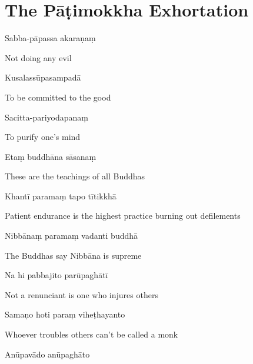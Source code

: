\section{The Pāṭimokkha Exhortation}

\begin{leader}
\end{leader}

Sabba-pāpassa akaraṇaṃ

\begin{cprenglish}
  Not doing any evil
\end{cprenglish}

Kusalassūpasampadā

\begin{cprenglish}
  To be committed to the good
\end{cprenglish}

Sacitta-pariyodapanaṃ

\begin{cprenglish}
  To purify one's mind
\end{cprenglish}

Etaṃ buddhāna sāsanaṃ

\begin{cprenglish}
  These are the teachings of all Buddhas
\end{cprenglish}

Khantī paramaṃ tapo tītikkhā

\begin{cprenglish}
  Patient endurance is the highest practice burning out defilements
\end{cprenglish}

Nibbānaṃ paramaṃ vadanti buddhā

\begin{cprenglish}
  The Buddhas say Nibbāna is supreme
\end{cprenglish}

Na hi pabbajito parūpaghātī

\begin{cprenglish}
  Not a renunciant is one who injures others
\end{cprenglish}

Samaṇo hoti paraṃ viheṭhayanto

\begin{cprenglish}
  Whoever troubles others can't be called a monk
\end{cprenglish}

Anūpavādo anūpaghāto

